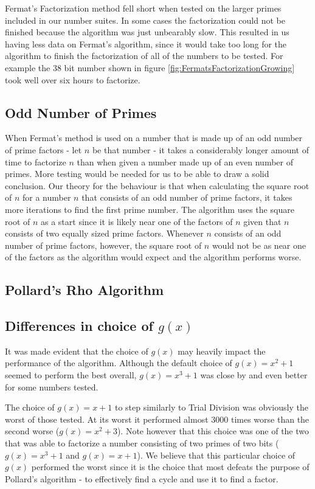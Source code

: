 Fermat's Factorization method fell short when tested on the larger primes included in our number suites. In some cases the factorization could not be finished because the algorithm was just unbearably slow. This resulted in us having less data on Fermat's algorithm, since it would take too long for the algorithm to finish the factorization of all of the numbers to be tested. For example the $38$ bit number shown in figure \ref{fig:FermatsFactorizationGrowing} took well over six hours to factorize.

\subsection{Odd Number of Primes}
When Fermat's method is used on a number that is made up of an odd number of prime factors - let $n$ be that number - it takes a considerably longer amount of time to factorize $n$ than when given a number made up of an even number of primes. More testing would be needed for us to be able to draw a solid conclusion. Our theory for the behaviour is that when calculating the square root of $n$ for a number $n$ that consists of an odd number of prime factors, it takes more iterations to find the first prime number. The algorithm uses the square root of $n$ as a start since it is likely near one of the factors of $n$ given that $n$ consists of two equally sized prime factors. Whenever $n$ consists of an odd number of prime factors, however, the square root of $n$ would not be as near one of the factors as the algorithm would expect and the algorithm performs worse.

\subsection{Pollard's Rho Algorithm}

\subsection{Differences in choice of $g(x)$}

It was made evident that the choice of $g(x)$ may heavily impact the performance of the algorithm. Although the default choice of $g(x)=x^2+1$ seemed to perform the best overall, $g(x)=x^3+1$ was close by and even better for some numbers tested.

The choice of $g(x)=x+1$ to step similarly to Trial Division was obviously the worst of those tested. At its worst it performed almost $3000$ times worse than the second worse ($g(x)=x^2+3$). Note however that this choice was one of the two that was able to factorize a number consisting of two primes of two bits ($g(x)=x^3+1$ and $g(x)=x+1$).
We believe that this particular choice of $g(x)$ performed the worst since it is the choice that most defeats the purpose of Pollard's algorithm - to effectively find a cycle and use it to find a factor.

